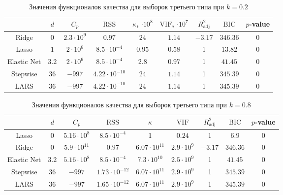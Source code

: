 \documentclass[a4paper,12pt]{article}
\newcommand{\vif}{\mathrm{VIF}}
\newcommand{\rss}{\mathrm{RSS}}
\newcommand{\bic}{\mathrm{BIC}}
\newcommand{\radj}{R_{\text{adj}}^2}
\theoremstyle{plain}
\begin{document}
\begin{table}[h]
\caption{Значения функционалов качества для выборок третьего типа при $k = 0.2$}
\centering
\begin{tabular}{|c|c|c|c|c|c|c|c|c|}
\hline 
 & $d$ & $C_p$ & $\rss$ & $\kappa$, $\cdot 10^8$ & $\vif$, $\cdot 10^7$ & $\radj$ & $\bic$ & $p$-value \\ 
\hline
Ridge & 0 & $2.3 \cdot 10^9 $ & $ 0.97 $ & $24$ & $ 1.14$ & $-3.17$ & $346.36$ & 0 \\ 
\hline 
Lasso & 1  & $2\cdot 10^6$ & $8.5 \cdot 10^{-4}$  & $0.95$ & $0.58$ & 1 & $13.82$ & 0 \\ 
\hline
Elastic Net & $3.2$ & $2 \cdot 10^6$ & $8.5 \cdot 10^{-4}$  & $2.8$ & $0.97$ & 1 & $41.45$  & 0 \\ 
\hline 
Stepwise & 36 & $-997$ & $4.22 \cdot 10^{-10}$  & $24$  & $ 1.14$ & 1  & $345.39$ & 0 \\
\hline 
LARS & 36 & $-997$ & $4.22 \cdot 10^{-10}$ & $24$ & $1.14$ & 1 & $345.39$ & 0 \\ 
\hline 
\end{tabular}
\label{tab:coltarget_0.2}
\end{table}

\begin{table}[h]
\centering
\caption{Значения функционалов качества для выборок третьего типа при $k = 0.8$}
\begin{tabular}{|c|c|c|c|c|c|c|c|c|}
\hline 
 & $d$ & $C_p$ & $\rss$ & $\kappa$ & $\vif$ & $\radj$ & $\bic$ & $p$-value \\ 
\hline 
Lasso & 0 & $5.16 \cdot 10^8$ & $8.5 \cdot 10^{-4}$ & 1 & $0.24$ & 1 & $6.9$ & 0 \\ 
\hline
Ridge & 0 & $5.9 \cdot 10^{11}$ & $0.97$ & $6.07 \cdot 10^{11}$ & $2.9 \cdot 10^9$ & $-3.17$ & $346.36$  & 0\\  
\hline 
Elastic Net & $3.2$ & $5.16 \cdot 10^8$ & $8.5 \cdot 10^{-4}$ & $7.3 \cdot 10^{10}$ & $2.5 \cdot 10^9$ & 1  & $41.45$ & 0 \\ 
\hline  
Stepwise & 36 & $-997$ & $1.73 \cdot 10^{-12}$ & $ 6.07 \cdot 10^{11}$ & $ 2.9 \cdot 10^9 $ & 1 & $345.39$ & 0 \\
\hline
LARS & 36 & $-997$ & $ 1.65 \cdot 10^{-12} $ & $6.07 \cdot 10^11$ & $ 2.9 \cdot 10^9$ & 1 & $ 345.39$ & 0\\
\hline
\end{tabular}
\label{tab:coltarget_0.8}
\end{table}

\end{document}
